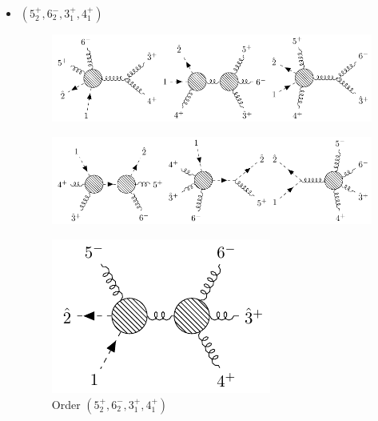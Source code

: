 \documentclass[12pt]{article}
\numberwithin{equation}{section}
\begin{document}
\begin{itemize}
    \item $(5_2^+,6_2^-,3_1^+,4_1^+)$
    \begin{figure}[H]
        \centering
        \includegraphics{6pt_1_6_1.pdf}
    \end{figure}
    \begin{figure}[H]
        \centering
        \includegraphics{6pt_1_6_2.pdf}
    \end{figure}
    \begin{figure}[H]
        \centering
        \includegraphics{6pt_1_6_3.pdf}
        \caption{Order $(5_2^+,6_2^-,3_1^+,4_1^+)$}
    \end{figure}
\end{itemize}
\end{document}
